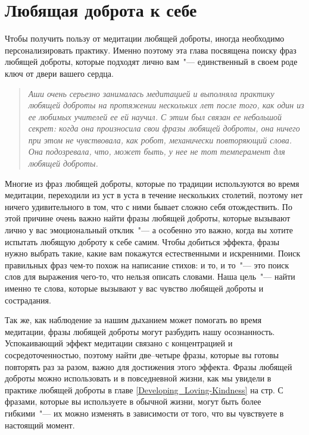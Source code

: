 
\chapter{Любящая доброта к себе} \label{Loving-Kindness_for_Ourselves}

Чтобы получить пользу от медитации любящей доброты, иногда необходимо персонализировать практику. Именно поэтому эта глава посвящена поиску фраз любящей доброты, которые подходят лично вам~"--- единственный в своем роде ключ от двери вашего сердца. 

\begin{quotation}
	\textit{
		Аши очень серьезно занималась медитацией и выполняла практику любящей доброты на протяжении нескольких лет после того, как один из ее любимых учителей ее ей научил. С этим был связан ее небольшой секрет: когда она произносила свои фразы любящей доброты, она ничего при этом не чувствовала, как робот, механически повторяющий слова. Она подозревала, что, может быть, у нее не тот темперамент для любящей доброты.
	}
\end{quotation}

Многие из фраз любящей доброты, которые по традиции используются во время медитации, переходили из уст в уста в течение нескольких столетий, поэтому нет ничего удивительного в том, что с ними бывает сложно себя отождествить. По этой причине очень важно найти фразы любящей доброты, которые вызывают лично у вас эмоциональный отклик~"--- а особенно это важно, когда вы хотите испытать любящую доброту к себе самим. Чтобы добиться эффекта, фразы нужно выбрать такие, какие вам покажутся естественными и искренними. Поиск правильных фраз чем-то похож на написание стихов: и то, и то~"--- это поиск слов для выражения чего-то, что нельзя описать словами. Наша цель~"--- найти именно те слова, которые вызывают у вас чувство любящей доброты и сострадания. 

Так же, как наблюдение за нашим дыханием может помогать во время медитации, фразы любящей доброты могут разбудить нашу осознанность. Успокаивающий эффект медитации связано с концентрацией и сосредоточенностью, поэтому найти две--четыре фразы, которые вы готовы повторять раз за разом, важно для достижения этого эффекта. Фразы любящей доброты можно использовать и в повседневной жизни, как мы увидели в практике любящей доброты в главе \ref{Developing_Loving-Kindness} на стр\:\pageref{Developing_Loving-Kindness}. С фразами, которые вы используете в обычной жизни, могут быть более гибкими~"--- их можно изменять в зависимости от того, что вы чувствуете в настоящий момент.

